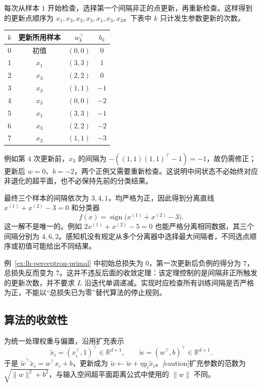 \begin{solve}
每次从样本 $1$ 开始检查，选择第一个间隔非正的点更新，再重新检查。这样得到的更新点顺序为 $x_1,x_3,x_3,x_3,x_1,x_3,x_3$。下表中 $k$ 只计发生参数更新的次数。
\begin{center}
\begin{tabular}{cccc}
\toprule
$k$ & 更新所用样本 & $w_k^\top$ & $b_k$ \\
\midrule
0 & 初值 & $(0,0)$ & $0$ \\
1 & $x_1$ & $(3,3)$ & $1$ \\
2 & $x_3$ & $(2,2)$ & $0$ \\
3 & $x_3$ & $(1,1)$ & $-1$ \\
4 & $x_3$ & $(0,0)$ & $-2$ \\
5 & $x_1$ & $(3,3)$ & $-1$ \\
6 & $x_3$ & $(2,2)$ & $-2$ \\
7 & $x_3$ & $(1,1)$ & $-3$ \\
\bottomrule
\end{tabular}
\end{center}
例如第 $4$ 次更新前，$x_3$ 的间隔为 $-((1,1)(1,1)^\top-1)=-1$，故仍需修正；更新后 $w=0$、$b=-2$，两个正例又需要重新检查。这说明中间状态不必始终对应非退化的超平面，也不必保持先前的分类结果。

最终三个样本的间隔依次为 $3,4,1$，均严格为正，因此得到分离直线 $x^{(1)}+x^{(2)}-3=0$ 和分类器
\[
f(x)=\operatorname{sign}\bigl(x^{(1)}+x^{(2)}-3\bigr).
\]
这一解不是唯一的。例如 $2x^{(1)}+x^{(2)}-5=0$ 也能严格分离相同数据，其三个间隔分别为 $4,6,2$。感知机没有规定从多个分离器中选择最大间隔者，不同选点顺序或初值可能给出不同结果。
\end{solve}

\begin{notealert}[type=caution,title={损失值不能替代训练停止检查}]
例~\ref{ex:lh-perceptron-primal} 中初始总损失为 $0$，第一次更新后负例的得分为 $7$，总损失反而变为 $7$。这并不违反后面的收敛定理：该定理控制的是间隔非正所触发的更新次数，并不要求 $L$ 沿迭代单调递减。实现时应检查所有训练间隔是否严格为正，不能以“总损失已为零”替代算法的停止规则。
\end{notealert}

\subsection{算法的收敛性}
\label{subsec:lh-perceptron-convergence}

为统一处理权重与偏置，沿用扩充表示
\begin{equation}
\label{eq:lh-perceptron-augmentation}
\widetilde x_i=(x_i^\top,1)^\top\in\mathbb R^{d+1},
\qquad
\widetilde w=(w^\top,b)^\top\in\mathbb R^{d+1}.
\end{equation}
于是 $\widetilde w^\top\widetilde x_i=w^\top x_i+b$，更新成为 $\widetilde w\leftarrow\widetilde w+\eta y_i\widetilde x_i$。\emph[caution]{扩充参数的范数为 $\sqrt{\|w\|^2+b^2}$，与输入空间超平面距离公式中使用的 $\|w\|$ 不同。}

